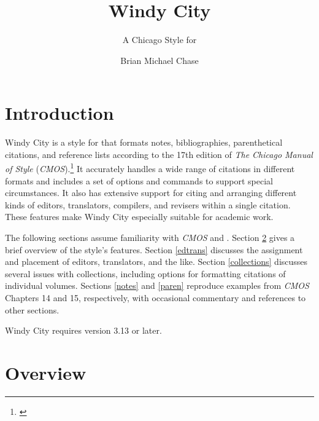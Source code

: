 \documentclass[11pt,letterpaper,oneside]{article}
\begin{document}
\title{Windy City}
\subtitle{A Chicago Style for \texttt{\biblatex}}
\author{Brian Michael Chase}
\maketitle
\begingroup
\hypersetup{linkcolor=black}
\tableofcontents{}
\endgroup

\section{Introduction}


Windy City is a style for \biblatex that formats notes,
bibliographies, parenthetical citations, and reference lists according
to the 17th edition of \textit{The Chicago Manual of Style}
(\textit{CMOS}).\footnote{\cite{chicago2017}} It accurately handles a
wide range of citations in different formats and includes a set of
options and commands to support special circumstances. It also has
extensive support for citing and arranging different kinds of editors,
translators, compilers, and revisers within a single citation. These
features make Windy City especially suitable for academic work.

The following sections assume familiarity with \textit{CMOS} and
\biblatex. Section \ref{overview} gives a brief overview of the
style's features. Section \ref{edtrans} discusses the assignment and
placement of editors, translators, and the like. Section
\ref{collections} discusses several issues with collections, including
options for formatting citations of individual volumes. Sections
\ref{notes} and \ref{paren} reproduce examples from \textit{CMOS}
Chapters 14 and 15, respectively, with occasional commentary and
references to other sections.

Windy City requires \biblatex version 3.13 or later.

\section{Overview}
\label{overview}
\end{document}
